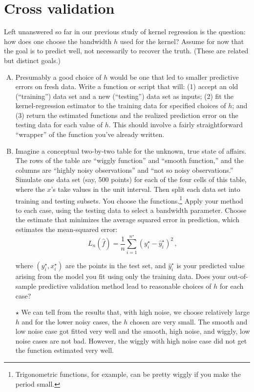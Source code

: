 \documentclass[11pt]{article}
\newcommand{\jie}{$\star$ }
\begin{document}
\section{Cross validation}

Left unanswered so far in our previous study of kernel regression is the question: how does one choose the bandwidth $h$ used for the kernel?  Assume for now that the goal is to predict well, not necessarily to recover the truth.  (These are related but distinct goals.)  

\begin{enumerate}[(A)]


\item  Presumably a good choice of $h$ would be one that led to smaller predictive errors on fresh data.  Write a function or script that will: (1) accept an old (``training'') data set and a new (``testing'') data set as inputs; (2) fit the kernel-regression estimator to the training data for specified choices of $h$; and (3) return the estimated functions and the realized prediction error on the testing data for each value of $h$.  This should involve a fairly straightforward ``wrapper'' of the function you've already written.

\item Imagine a conceptual two-by-two table for the unknown, true state of affairs.  The rows of the table are ``wiggly function'' and ``smooth function,'' and the columns are ``highly noisy observations'' and ``not so noisy observations.''  Simulate one data set (say, 500 points) for each of the four cells of this table, where the $x$'s take values in the unit interval.  Then split each data set into training and testing subsets.  You choose the functions.\footnote{Trigonometric functions, for example, can be pretty wiggly if you make the period small.}   Apply your method to each case, using the testing data to select a bandwidth parameter.  Choose the estimate that minimizes the average squared error in prediction, which estimates the mean-squared error:
$$
L_n(\hat{f}) = \frac{1}{n}\sum_{i=1}^{n^{\star}} (y^{\star}_i - \hat{y}_i^{\star} )^2 \, ,
$$

where $(y_i^{\star}, x_i^{\star})$ are the points in the test set, and $ \hat{y}_i^{\star}$ is your predicted value arising from the model you fit using only the training data.  Does your out-of-sample predictive validation method lead to reasonable choices of $h$ for each case?

\bigskip \jie
We can tell from the results that, with high noise, we choose relatively large $h$ and for the lower noisy cases, the $h$ chosen are very small. The smooth and low noise case got fitted very well and the smooth, high noise, and wiggly, low noise cases are not bad. However, the wiggly with high noise case did not get the function estimated very well.


\end{enumerate}
\end{document}
